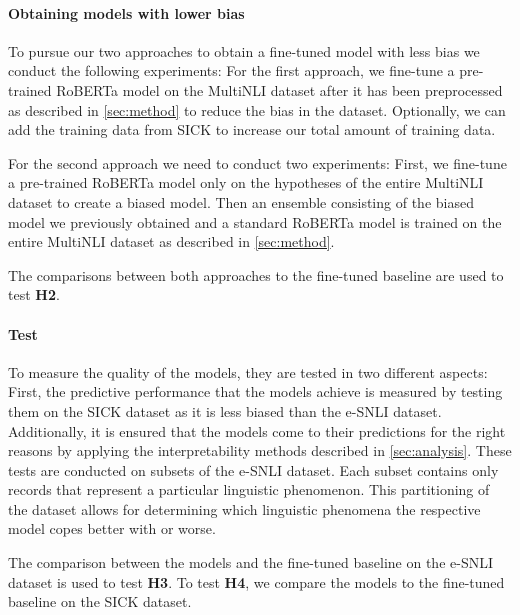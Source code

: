 \paragraph{Obtaining models with lower bias}
To pursue our two approaches to obtain a fine-tuned model with less bias we conduct the following experiments: For the first approach, we fine-tune a pre-trained \ac{RoBERTa} model on the \ac{MultiNLI} dataset after it has been preprocessed as described in \autoref{sec:method} to reduce the bias in the dataset. Optionally, we can add the training data from \ac{SICK} to increase our total amount of training data.

For the second approach we need to conduct two experiments: First, we fine-tune a pre-trained \ac{RoBERTa} model only on the hypotheses of the entire \ac{MultiNLI} dataset to create a biased model. Then an ensemble consisting of the biased model we previously obtained and a standard \ac{RoBERTa} model is trained on the entire \ac{MultiNLI} dataset as described in \autoref{sec:method}.

The comparisons between both approaches to the fine-tuned baseline are used to test \textbf{H2}.

\paragraph{Test}
To measure the quality of the models, they are tested in two different aspects: First, the predictive performance that the models achieve is measured by testing them on the SICK dataset as it is less biased than the \ac{e-SNLI} dataset. Additionally, it is ensured that the models come to their predictions for the right reasons by applying the interpretability methods described in \autoref{sec:analysis}. These tests are conducted on subsets of the \ac{e-SNLI} dataset. Each subset contains only records that represent a particular linguistic phenomenon. This partitioning of the dataset allows for determining which linguistic phenomena the respective model copes better with or worse.

The comparison between the models and the fine-tuned baseline on the \ac{e-SNLI} dataset is used to test \textbf{H3}. To test \textbf{H4}, we compare the models to the fine-tuned baseline on the \ac{SICK} dataset.
